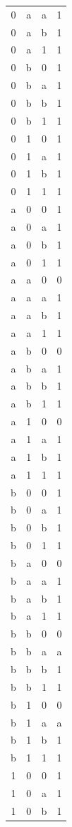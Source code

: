 \documentclass[11pt]{article}
\begin{document}
\begin{table}[ht]
\begin{minipage}{0.3\textwidth}
{\begin{tabular}{cccc}
0 & a & a & 1 \\
0 & a & b & 1 \\
0 & a & 1 & 1 \\
0 & b & 0 & 1 \\
0 & b & a & 1 \\
0 & b & b & 1 \\
0 & b & 1 & 1 \\
0 & 1 & 0 & 1 \\
0 & 1 & a & 1 \\
0 & 1 & b & 1 \\
0 & 1 & 1 & 1 \\
a & 0 & 0 & 1 \\
a & 0 & a & 1 \\
a & 0 & b & 1 \\
a & 0 & 1 & 1 \\
a & a & 0 & 0 \\
a & a & a & 1 \\
a & a & b & 1 \\
a & a & 1 & 1 \\
a & b & 0 & 0 \\
a & b & a & 1 \\
a & b & b & 1 \\
a & b & 1 & 1 \\
a & 1 & 0 & 0 \\
a & 1 & a & 1 \\
a & 1 & b & 1 \\
a & 1 & 1 & 1 \\
b & 0 & 0 & 1 \\
b & 0 & a & 1 \\
b & 0 & b & 1 \\
b & 0 & 1 & 1 \\
b & a & 0 & 0 \\
b & a & a & 1 \\
b & a & b & 1 \\
b & a & 1 & 1 \\
b & b & 0 & 0 \\
b & b & a & a \\
b & b & b & 1 \\
b & b & 1 & 1 \\
b & 1 & 0 & 0 \\
b & 1 & a & a \\
b & 1 & b & 1 \\
b & 1 & 1 & 1 \\
1 & 0 & 0 & 1 \\
1 & 0 & a & 1 \\
1 & 0 & b & 1 \\

\end{tabular}}
\end{minipage}
\end{table}
\end{document}
